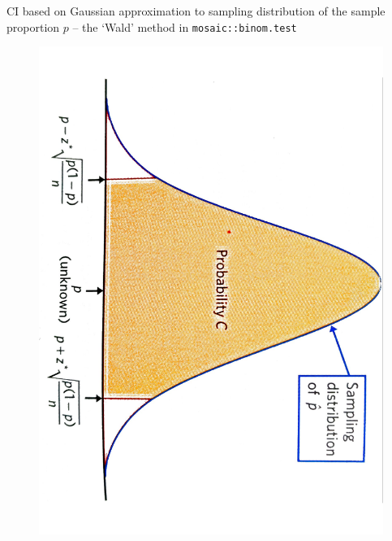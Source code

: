 \documentclass[10pt]{beamer}\usepackage[]{graphicx}\usepackage[]{color}
\begin{document}
\begin{frame}{CI based on Gaussian approximation to sampling distribution of the sample proportion $p$ -- the `Wald' method in \texttt{mosaic::binom.test}}
	\begin{center}
	\begin{figure}
		\includegraphics[scale=0.3,angle=90]{prop1.pdf}
	\end{figure}
\end{center}
	
\end{frame}
\end{document}
